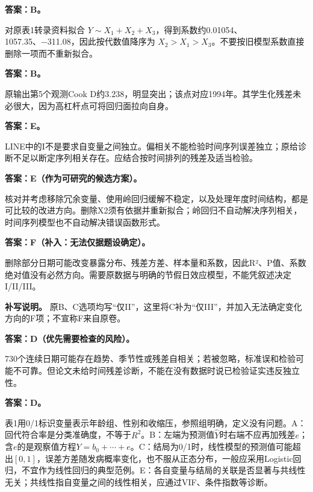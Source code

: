 
\textbf{答案：B。}

对原表1转录资料拟合 \(Y\sim X_1+X_2+X_3\)，得到系数约0.01054、1057.35、−311.08，因此按代数值降序为 \(X_2>X_1>X_3\)。不要按旧模型系数直接删除一项而不重新拟合。



\textbf{答案：B。}

原输出第5个观测Cook D约3.238，明显突出；该点对应1994年。其学生化残差未必很大，因为高杠杆点可将回归面拉向自身。



\textbf{答案：E。}

LINE中的I不是要求自变量之间独立。偏相关不能检验时间序列误差独立；原给诊断不足以断定序列相关存在。应结合按时间排列的残差及适当检验。



\textbf{答案：E（作为可研究的候选方案）。}

核对并考虑移除冗余变量、使用岭回归缓解不稳定，以及处理年度时间结构，都是可比较的改进方向。删除X2须有依据并重新拟合；岭回归不自动解决序列相关，时间序列模型也不自动解决错误函数形式。



\textbf{答案：F（补入：无法仅据题设确定）。}

删除部分日期可能改变暴露分布、残差方差、样本量和系数，因此R²、P值、系数绝对值没有必然方向。需要原数据与明确的节假日效应模型，不能凭叙述决定I/II/III。


\textbf{补写说明。} 原B、C选项均写``仅II''，这里将C补为``仅III''，并加入无法确定变化方向的F项；不宣称F来自原卷。



\textbf{答案：D（优先需要检查的风险）。}

730个连续日期可能存在趋势、季节性或残差自相关；若被忽略，标准误和检验可能不可靠。但论文未给时间残差诊断，不能在没有数据时说已检验证实违反独立性。



\textbf{答案：D。}

表1用0/1标识变量表示年龄组、性别和收缩压，参照组明确，定义没有问题。A：回代符合率是分类准确度，不等于\(R^2\)。B：左端为预测值\(\hat Y\)时右端不应再加残差\(e\)；含\(e\)的是观察值方程\(Y=b_0+\cdots+e\)。C：结局为0/1时，线性模型的预测值可能超出\([0,1]\)，误差方差随发病概率变化，也不服从正态分布，一般应采用Logistic回归，不宜作为线性回归的典型范例。E：各自变量与结局的关联是否显著与共线性无关；共线性指自变量之间的线性相关，应通过VIF、条件指数等诊断。

